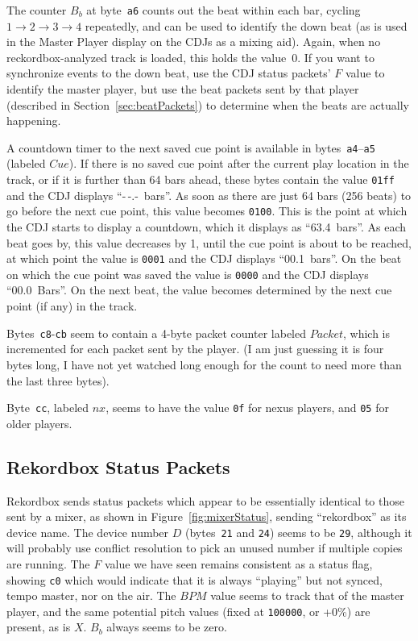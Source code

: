 \documentclass[11pt]{article}
\begin{document}
The counter $B_b$ at byte~{\tt a6} counts out the beat within each bar,
cycling $1\to2\to3\to4$ repeatedly, and can be used to identify the
down beat (as is used in the Master Player display on the CDJs as a
mixing aid). Again, when no reckordbox-analyzed track is loaded, this
holds the value~0. If you want to synchronize events to the down beat,
use the CDJ status packets' $F$ value to identify the master player,
but use the beat packets sent by that player (described in
Section~\ref{sec:beatPackets}) to determine when the beats are
actually happening.

A countdown timer to the next saved cue point is available in
bytes~{\tt a4}--{\tt a5} (labeled $Cue$). If there is no saved cue
point after the current play location in the track, or if it is
further than 64 bars ahead, these bytes contain the value {\tt 01ff}
and the CDJ displays ``-\,-.-~bars''. As soon as there are just 64
bars (256 beats) to go before the next cue point, this value becomes
{\tt 0100}. This is the point at which the CDJ starts to display a
countdown, which it displays as ``63.4~bars''. As each beat goes by,
this value decreases by 1, until the cue point is about to be reached,
at which point the value is {\tt 0001} and the CDJ displays
``00.1~bars''. On the beat on which the cue point was saved the value
is {\tt 0000} and the CDJ displays ``00.0~Bars''. On the next beat,
the value becomes determined by the next cue point (if any) in the
track.

Bytes~{\tt c8}-{\tt cb} seem to contain a 4-byte packet counter
labeled $Packet$, which is incremented for each packet sent by the
player. (I am just guessing it is four bytes long, I have not yet
watched long enough for the count to need more than the last three
bytes).

Byte~{\tt cc}, labeled $nx$, seems to have the value {\tt 0f} for
nexus players, and {\tt 05} for older players.

\subsection{Rekordbox Status Packets}

Rekordbox sends status packets which appear to be essentially
identical to those sent by a mixer, as shown in
Figure~\ref{fig:mixerStatus}, sending ``rekordbox'' as its device
name. The device number $D$ (bytes~{\tt 21} and {\tt 24}) seems to be
{\tt 29}, although it will probably use conflict resolution to pick an
unused number if multiple copies are running. The $F$ value we have
seen remains consistent as a status flag, showing {\tt c0} which would
indicate that it is always ``playing'' but not synced, tempo master,
nor on the air. The $BPM$ value seems to track that of the master
player, and the same potential pitch values (fixed at {\tt 100000}, or
+0\%) are present, as is $X$. $B_b$ always seems to be zero.
\end{document}
